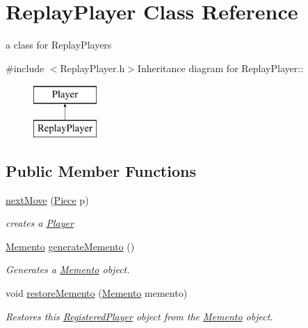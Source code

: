 \hypertarget{classReplayPlayer}{
\section{ReplayPlayer Class Reference}
\label{classReplayPlayer}
}


a class for ReplayPlayers  


{\ttfamily \#include $<$ReplayPlayer.h$>$}Inheritance diagram for ReplayPlayer::\begin{figure}[H]
\begin{center}
\leavevmode
\includegraphics[height=2cm]{classReplayPlayer}
\end{center}
\end{figure}
\subsection*{Public Member Functions}
\begin{DoxyCompactItemize}
\item 
\hyperlink{classReplayPlayer_a39c2542b03506ff19487dc8675741298}{nextMove} (\hyperlink{classPiece}{Piece} p)
\begin{DoxyCompactList}\small\item\em creates a \hyperlink{classPlayer}{Player} \item\end{DoxyCompactList}\item 
\hyperlink{classMemento}{Memento} \hyperlink{classReplayPlayer_a9301be927a78f52b14602f6660ce35c4}{generateMemento} ()
\begin{DoxyCompactList}\small\item\em Generates a \hyperlink{classMemento}{Memento} object. \item\end{DoxyCompactList}\item 
void \hyperlink{classReplayPlayer_af45543802dc6f5ac1f7d8f2582c7a04e}{restoreMemento} (\hyperlink{classMemento}{Memento} memento)
\begin{DoxyCompactList}\small\item\em Restores this \hyperlink{classRegisteredPlayer}{RegisteredPlayer} object from the \hyperlink{classMemento}{Memento} object. \item\end{DoxyCompactList}\end{DoxyCompactItemize}



